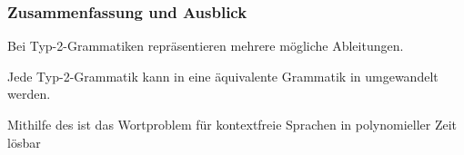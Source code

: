 \documentclass[onlymath]{beamer}
\begin{document}
\begin{frame}\frametitle{Zusammenfassung und Ausblick}

Bei Typ-2-Grammatiken repräsentieren  mehrere mögliche Ableitungen.
\bigskip

Jede Typ-2-Grammatik kann in eine äquivalente Grammatik in  umgewandelt werden.
\bigskip

Mithilfe des  ist das Wortproblem für kontextfreie Sprachen in polynomieller Zeit lösbar


\end{frame}
\end{document}
